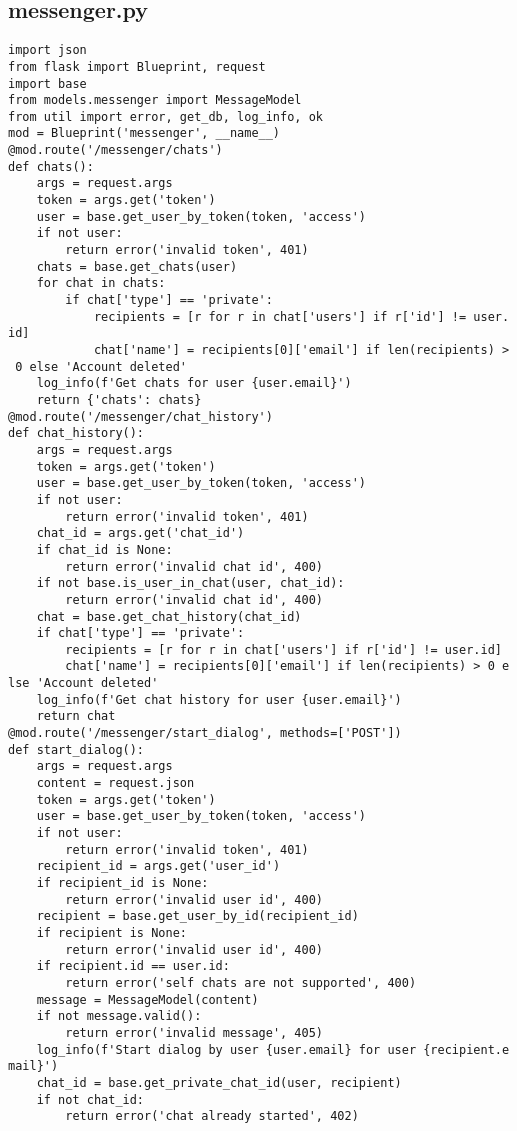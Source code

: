 \documentclass[listing]{espd}
\begin{document}
\subsection{messenger.py}
\begin{verbatim}
import json
from flask import Blueprint, request
import base
from models.messenger import MessageModel
from util import error, get_db, log_info, ok
mod = Blueprint('messenger', __name__)
@mod.route('/messenger/chats')
def chats():
    args = request.args
    token = args.get('token')
    user = base.get_user_by_token(token, 'access')
    if not user:
        return error('invalid token', 401)
    chats = base.get_chats(user)
    for chat in chats:
        if chat['type'] == 'private':
            recipients = [r for r in chat['users'] if r['id'] != user.
id]
            chat['name'] = recipients[0]['email'] if len(recipients) >
 0 else 'Account deleted'
    log_info(f'Get chats for user {user.email}')
    return {'chats': chats}
@mod.route('/messenger/chat_history')
def chat_history():
    args = request.args
    token = args.get('token')
    user = base.get_user_by_token(token, 'access')
    if not user:
        return error('invalid token', 401)
    chat_id = args.get('chat_id')
    if chat_id is None:
        return error('invalid chat id', 400)
    if not base.is_user_in_chat(user, chat_id):
        return error('invalid chat id', 400)
    chat = base.get_chat_history(chat_id)
    if chat['type'] == 'private':
        recipients = [r for r in chat['users'] if r['id'] != user.id]
        chat['name'] = recipients[0]['email'] if len(recipients) > 0 e
lse 'Account deleted'
    log_info(f'Get chat history for user {user.email}')
    return chat
@mod.route('/messenger/start_dialog', methods=['POST'])
def start_dialog():
    args = request.args
    content = request.json
    token = args.get('token')
    user = base.get_user_by_token(token, 'access')
    if not user:
        return error('invalid token', 401)
    recipient_id = args.get('user_id')
    if recipient_id is None:
        return error('invalid user id', 400)
    recipient = base.get_user_by_id(recipient_id)
    if recipient is None:
        return error('invalid user id', 400)
    if recipient.id == user.id:
        return error('self chats are not supported', 400)
    message = MessageModel(content)
    if not message.valid():
        return error('invalid message', 405)
    log_info(f'Start dialog by user {user.email} for user {recipient.e
mail}')
    chat_id = base.get_private_chat_id(user, recipient)
    if not chat_id:
        return error('chat already started', 402)

\end{verbatim}
\end{document}
